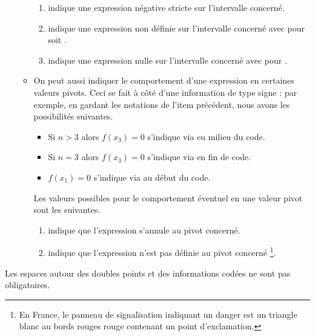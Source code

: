 \documentclass[10pt, a4paper]{article}
\begin{document}
\begin{enumerate}
\begin{itemize}
\begin{enumerate}
			\item \tdocinlatex{-} indique une expression négative stricte sur l'intervalle concerné.
			
			\item {} indique une expression non définie sur l'intervalle concerné avec  pour  soit 
.
	
			\item {} indique une expression nulle sur l'intervalle concerné avec  pour .
		\end{enumerate}

        
        \item On peut aussi indiquer le comportement d'une expression en certaines valeurs pivots. Ceci se fait à côté d'une information de type signe : par exemple, en gardant les notations de l'item précédent, nous avons les possibilités suivantes.
        \begin{itemize}
        	\item Si $n > 3$ alors $f(x_3) = 0$ s'indique via  eu milieu du code.
	
        	\item Si $n = 3$ alors $f(x_3) = 0$ s'indique via  en fin de code.
	
        	\item $f(x_1) = 0$ s'indique via 	au début du code.
        \end{itemize}
        Les valeurs possibles pour le comportement éventuel en une valeur pivot sont les suivantes.
		\begin{enumerate}
			\item {} indique que 
l'expression s'annule au pivot concerné.
			
			\item \tdocinlatex{!} indique que 
l'expression n'est pas définie au pivot concerné
        	\footnote{
        		En France, le panneau de signalisation indiquant un danger est un triangle blanc au bords rouges rouge contenant un point d'exclamation.
			}.
		\end{enumerate}
    \end{itemize}
\end{enumerate}




\begin{tdocnote}
    Les espaces autour des doubles points et des informations codées ne sont pas obligatoires.
\end{tdocnote}
\end{document}
